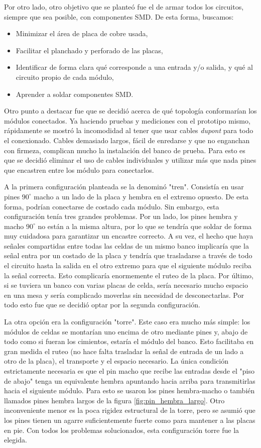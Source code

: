 Por otro lado, otro objetivo que se planteó fue el de armar todos los circuitos, siempre que sea posible, con componentes SMD. De esta forma, buscamos:
\begin{itemize}
    \item Minimizar el área de placa de cobre usada,
    \item Facilitar el planchado y perforado de las placas,
    \item Identificar de forma clara qué corresponde a una entrada y/o salida, y qué al circuito propio de cada módulo,
    \item Aprender a soldar componentes SMD.
\end{itemize}

Otro punto a destacar fue que se decidió acerca de qué topología conformarían los módulos conectados. Ya haciendo pruebas y mediciones con el prototipo mismo, rápidamente se mostró la incomodidad al tener que usar cables \textit{dupont} para todo el conexionado. Cables demasiado largos, fácil de enredarse y que no enganchan con firmeza, complican mucho la instalación del banco de prueba. Para esto es que se decidió eliminar el uso de cables individuales y utilizar más que nada pines que encastren entre los módulo para conectarlos.

A la primera configuración planteada se la denominó "tren". Consistía en usar pines $90^\circ$ macho a un lado de la placa y hembra en el extremo opuesto. De esta forma, podrían conectarse de costado cada módulo. Sin embargo, esta configuración tenía tres grandes problemas. Por un lado, los pines hembra y macho $90^\circ$ no están a la misma altura, por lo que se tendría que soldar de forma muy cuidadosa para garantizar un encastre correcto. A su vez, el hecho que haya señales compartidas entre todas las celdas de un mismo banco implicaría que la señal entra por un costado de la placa y tendría que trasladarse a través de todo el circuito hasta la salida en el otro extremo para que el siguiente módulo reciba la señal correcta. Esto complicaría enormemente el ruteo de la placa. Por último, si se tuviera un banco con varias placas de celda, sería necesario mucho espacio en una mesa y sería complicado moverlas sin necesidad de desconectarlas. Por todo esto fue que se decidió optar por la segunda configuración.

La otra opción era la configuración "torre". Este caso era mucho más simple: los módulos de celdas se montarían uno encima de otro mediante pines y, abajo de todo como si fueran los cimientos, estaría el módulo del banco. Esto facilitaba en gran medida el ruteo (no hace falta trasladar la señal de entrada de un lado a otro de la placa), el transporte y el espacio necesario. La única condición estrictamente necesaria es que el pin macho que recibe las entradas desde el "piso de abajo" tenga un equivalente hembra apuntando hacia arriba para transmitirlas hacia el siguiente módulo. Para esto se usaron los pines hembra-macho o también llamados pines hembra largos de la figura \ref{fig:pin_hembra_largo}. Otro inconveniente menor es la poca rigidez estructural de la torre, pero se asumió que los pines tienen un agarre suficientemente fuerte como para mantener a las placas en pie. Con todos los problemas solucionados, esta configuración torre fue la elegida.

